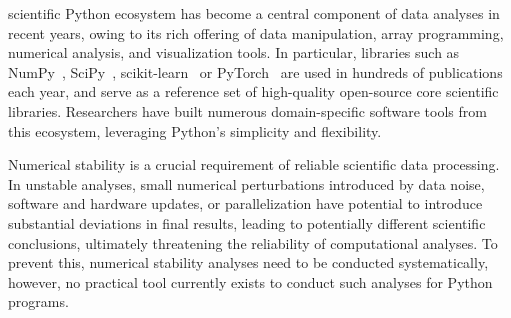 \documentclass[10pt,journal,compsoc]{IEEEtran}
\begin{document}
%
\IEEEpeerreviewmaketitle




 scientific Python ecosystem has become a central component
of data analyses in recent years, owing to its rich offering of data
manipulation, array programming, numerical analysis, and visualization tools. In
particular, libraries such as NumPy~\cite{harris2020array},
SciPy~\cite{virtanen2020scipy}, scikit-learn~\cite{pedregosa2011scikit} or
PyTorch~\cite{paszke2019pytorch} are used in hundreds of publications each year,
and serve as a reference set of high-quality open-source core scientific
libraries. Researchers have built numerous domain-specific software tools from
this ecosystem, leveraging Python's simplicity and flexibility. 

Numerical stability is a crucial requirement of reliable scientific data
processing. In unstable analyses, small numerical perturbations introduced by
data noise, software and hardware updates, or parallelization have potential to
introduce substantial deviations in final results, leading to potentially
different scientific conclusions, ultimately threatening the reliability of
computational analyses. To prevent this, numerical stability analyses need to be
conducted systematically, however, no practical tool currently exists to conduct
such analyses for Python programs.
\end{document}
